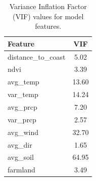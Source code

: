 \begin{table}[H]
\centering
\caption{Variance Inflation Factor (VIF) values for model features.}
\begin{tabular}{l c}
\hline
\textbf{Feature} & \textbf{VIF} \\
\hline
distance\_to\_coast & 5.02 \\
ndvi                & 3.39 \\
avg\_temp           & 13.60 \\
var\_temp           & 14.24 \\
avg\_prcp           & 7.20 \\
var\_prcp           & 2.57 \\
avg\_wind           & 32.70 \\
avg\_dir            & 1.65 \\
avg\_soil           & 64.95 \\
farmland            & 3.49 \\
\hline
\end{tabular}
\label{tab:vif}
\end{table}
